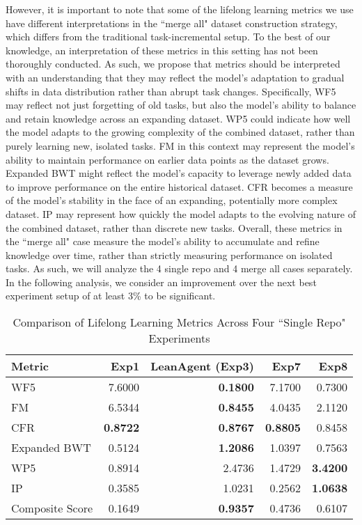 \documentclass{article} %
\begin{document}
However, it is important to note that some of the lifelong learning metrics we use have different interpretations in the ``merge all" dataset construction strategy, which differs from the traditional task-incremental setup. To the best of our knowledge, an interpretation of these metrics in this setting has not been thoroughly conducted. As such, we propose that metrics should be interpreted with an understanding that they may reflect the model's adaptation to gradual shifts in data distribution rather than abrupt task changes. Specifically, WF5 may reflect not just forgetting of old tasks, but also the model's ability to balance and retain knowledge across an expanding dataset. WP5 could indicate how well the model adapts to the growing complexity of the combined dataset, rather than purely learning new, isolated tasks. FM in this context may represent the model's ability to maintain performance on earlier data points as the dataset grows. Expanded BWT might reflect the model's capacity to leverage newly added data to improve performance on the entire historical dataset. CFR becomes a measure of the model's stability in the face of an expanding, potentially more complex dataset. IP may represent how quickly the model adapts to the evolving nature of the combined dataset, rather than discrete new tasks. Overall, these metrics in the ``merge all" case measure the model's ability to accumulate and refine knowledge over time, rather than strictly measuring performance on isolated tasks. As such, we will analyze the 4 single repo and 4 merge all cases separately. In the following analysis, we consider an improvement over the next best experiment setup of at least 3\% to be significant.

\begin{table}
\caption{Comparison of Lifelong Learning Metrics Across Four ``Single Repo" Experiments}
\label{tab:experiment-metrics}
\centering
\begin{tabular}{lrrrr}
\hline
Metric & Exp1 & LeanAgent (Exp3) & Exp7 & Exp8 \\
\hline
WF5 & 7.6000 & \textbf{0.1800} & 7.1700 & 0.7300 \\
FM & 6.5344 & \textbf{0.8455} & 4.0435 & 2.1120 \\
CFR & \textbf{0.8722} & \textbf{0.8767} & \textbf{0.8805} & 0.8458 \\
Expanded BWT & 0.5124 & \textbf{1.2086} & 1.0397 & 0.7563 \\
WP5 & 0.8914 & 2.4736 & 1.4729 & \textbf{3.4200} \\
IP & 0.3585 & 1.0231 & 0.2562 & \textbf{1.0638} \\
\hline
Composite Score & 0.1649 & \textbf{0.9357} & 0.4736 & 0.6107 \\
\hline
\end{tabular}
\end{table}
\end{document}
